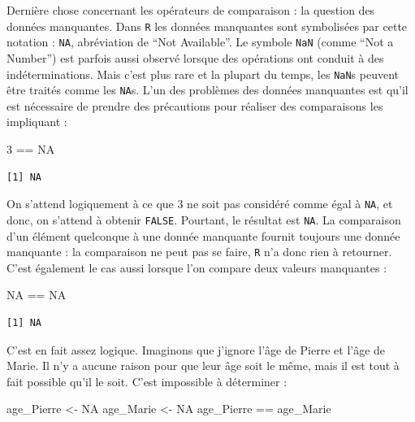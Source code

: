 \documentclass[
  a4paper,
  DIV=11,
  numbers=noendperiod,
  oneside]{scrreprt}
\newenvironment{Shaded}{}{}
\newcommand{\ConstantTok}[1]{\textcolor[rgb]{0.00,0.36,0.77}{#1}}
\newcommand{\DecValTok}[1]{\textcolor[rgb]{0.00,0.36,0.77}{#1}}
\newcommand{\NormalTok}[1]{\textcolor[rgb]{0.14,0.16,0.18}{#1}}
\newcommand{\OtherTok}[1]{\textcolor[rgb]{0.44,0.26,0.76}{#1}}
\newcommand{\SpecialCharTok}[1]{\textcolor[rgb]{0.00,0.36,0.77}{#1}}
\begin{document}
Dernière chose concernant les opérateurs de comparaison : la question
des données manquantes. Dans \texttt{R} les données manquantes sont
symbolisées par cette notation : \texttt{NA}, abréviation de ``Not
Available''. Le symbole \texttt{NaN} (comme ``Not a Number'') est
parfois aussi observé lorsque des opérations ont conduit à des
indéterminations. Mais c'est plus rare et la plupart du temps, les
\texttt{NaN}s peuvent être traités comme les \texttt{NA}s. L'un des
problèmes des données manquantes est qu'il est nécessaire de prendre des
précautions pour réaliser des comparaisons les impliquant :

\begin{Shaded}
\begin{Highlighting}[]
\DecValTok{3} \SpecialCharTok{==} \ConstantTok{NA}
\end{Highlighting}
\end{Shaded}

\begin{verbatim}
[1] NA
\end{verbatim}

On s'attend logiquement à ce que 3 ne soit pas considéré comme égal à
\texttt{NA}, et donc, on s'attend à obtenir \texttt{FALSE}. Pourtant, le
résultat est \texttt{NA}. La comparaison d'un élément quelconque à une
donnée manquante fournit toujours une donnée manquante : la comparaison
ne peut pas se faire, \texttt{R} n'a donc rien à retourner. C'est
également le cas aussi lorsque l'on compare deux valeurs manquantes :

\begin{Shaded}
\begin{Highlighting}[]
\ConstantTok{NA} \SpecialCharTok{==} \ConstantTok{NA}
\end{Highlighting}
\end{Shaded}

\begin{verbatim}
[1] NA
\end{verbatim}

C'est en fait assez logique. Imaginons que j'ignore l'âge de Pierre et
l'âge de Marie. Il n'y a aucune raison pour que leur âge soit le même,
mais il est tout à fait possible qu'il le soit. C'est impossible à
déterminer :

\begin{Shaded}
\begin{Highlighting}[]
\NormalTok{age\_Pierre }\OtherTok{\textless{}{-}} \ConstantTok{NA}
\NormalTok{age\_Marie }\OtherTok{\textless{}{-}} \ConstantTok{NA}
\NormalTok{age\_Pierre }\SpecialCharTok{==}\NormalTok{ age\_Marie}
\end{Highlighting}
\end{Shaded}
\end{document}

